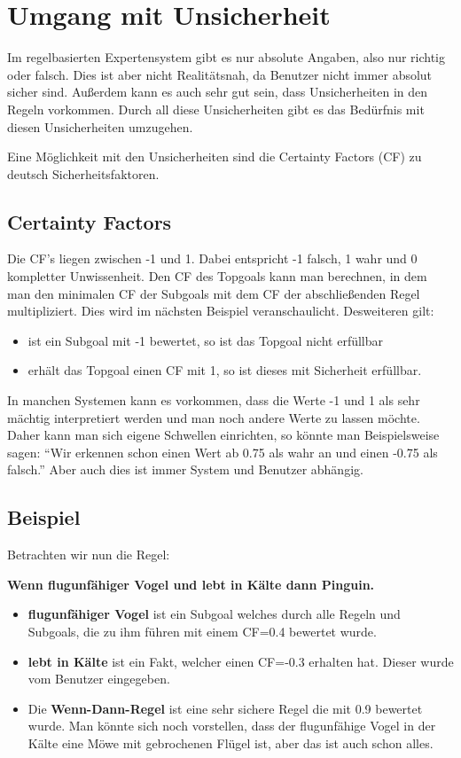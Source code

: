\section{Umgang mit Unsicherheit}
Im regelbasierten Expertensystem gibt es nur absolute Angaben, also nur richtig oder falsch. Dies ist aber nicht Realitätsnah, da Benutzer nicht immer absolut sicher sind. Außerdem kann es auch sehr gut sein, dass Unsicherheiten in den Regeln vorkommen. Durch all diese Unsicherheiten gibt es das Bedürfnis mit diesen Unsicherheiten umzugehen. 

Eine Möglichkeit mit den Unsicherheiten sind die Certainty Factors (CF) zu deutsch Sicherheitsfaktoren.

\subsection{Certainty Factors}
Die CF's liegen zwischen -1 und 1. Dabei entspricht -1 falsch, 1 wahr und 0 kompletter Unwissenheit. Den CF des Topgoals kann man berechnen, in dem man den minimalen CF der Subgoals mit dem CF der abschließenden Regel multipliziert. Dies wird im nächsten Beispiel veranschaulicht. Desweiteren gilt:
\begin{itemize}
	\item ist ein Subgoal mit -1 bewertet, so ist das Topgoal nicht erfüllbar
	\item erhält das Topgoal einen CF mit 1, so ist dieses mit Sicherheit erfüllbar.
\end{itemize}
In manchen Systemen kann es vorkommen, dass die Werte -1 und 1 als sehr mächtig interpretiert werden und man noch andere Werte zu lassen möchte. Daher kann man sich eigene Schwellen einrichten, so könnte man Beispielsweise sagen: "`Wir erkennen schon einen Wert ab 0.75 als wahr an und einen -0.75 als falsch."' Aber auch dies ist immer System und Benutzer abhängig. 

\subsection*{Beispiel}
Betrachten wir nun die Regel:

{\bfseries Wenn flugunfähiger Vogel und lebt in Kälte dann Pinguin.}

\begin{itemize}
\item {\bfseries flugunfähiger Vogel} ist ein Subgoal welches durch alle Regeln und Subgoals, die zu ihm führen mit einem CF=0.4 bewertet wurde.
\item {\bfseries lebt in Kälte} ist ein Fakt, welcher einen CF=-0.3 erhalten hat. Dieser wurde vom Benutzer eingegeben. 
\item Die {\bfseries Wenn-Dann-Regel} ist eine sehr sichere Regel die mit 0.9 bewertet wurde. Man könnte sich noch vorstellen, dass der flugunfähige Vogel in der Kälte eine Möwe mit gebrochenen Flügel ist, aber das ist auch schon alles.
\end{itemize}

